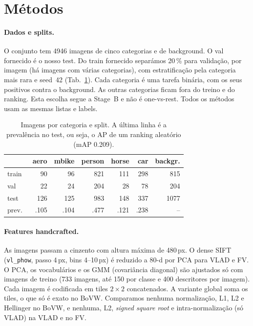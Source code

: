 \section{Métodos}
\label{sec:method}

\paragraph{Dados e splits.}
O conjunto tem 4946 imagens de cinco categorias e de background. O val fornecido é o nosso test. Do train fornecido separámos 20\,\% para validação, por imagem (há imagens com várias categorias), com estratificação pela categoria mais rara e seed~42 (Tab.~\ref{tab:splits}). Cada categoria é uma
tarefa binária, com os seus positivos contra o background. As outras categorias ficam fora do treino e do ranking. Esta escolha segue a Stage~B e não é one-vs-rest. Todos os métodos usam as mesmas listas e labels.

\begin{table}[t]
\centering
\caption{Imagens por categoria e split. A última linha é a prevalência no
test, ou seja, o AP de um ranking aleatório (mAP 0.209).}
\label{tab:splits}
\small
\setlength\tabcolsep{4pt}
\begin{tabular}{lrrrrrr}
\toprule
 & aero & mbike & person & horse & car & backgr. \\
\midrule
train & 90  & 96  & 821 & 111 & 298 & 815  \\
val   & 22  & 24  & 204 & 28  & 78  & 204  \\
test  & 126 & 125 & 983 & 148 & 337 & 1077 \\
\midrule
prev.\ & .105 & .104 & .477 & .121 & .238 & -- \\
\bottomrule
\end{tabular}
\end{table}

\paragraph{Features handcrafted.}
As imagens passam a cinzento com altura máxima de 480\,px. O dense SIFT (\texttt{vl\_phow}, passo 4\,px, bins 4--10\,px) é reduzido a 80-d por PCA para VLAD e FV. O PCA, os vocabulários e os GMM (covariância diagonal) são ajustados só com imagens de treino (733 imagens, até 150 por classe e 400 descritores por imagem). Cada imagem
é codificada em tiles $2\times2$ concatenados. A variante global soma os tiles, o que só é exato no BoVW. Comparamos nenhuma normalização, L1, L2 e Hellinger no BoVW, e nenhuma, L2, \emph{signed square root} e intra-normalização (só VLAD) na VLAD e no FV.

